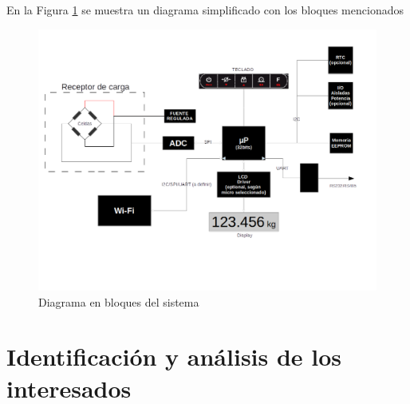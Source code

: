 \documentclass[11pt]{charter}
\begin{document}
En la Figura \ref{fig:diagBloques} se muestra un diagrama simplificado con los bloques mencionados

\vspace{25px}

\begin{figure}[htpb]
\centering 
\includegraphics[width=.7\textwidth]{./Figuras/esquema.png}
\caption{Diagrama en bloques del sistema}
\label{fig:diagBloques}
\end{figure}

\vspace{25px}

\section{Identificación y análisis de los interesados}
\label{sec:interesados}
\end{document}
